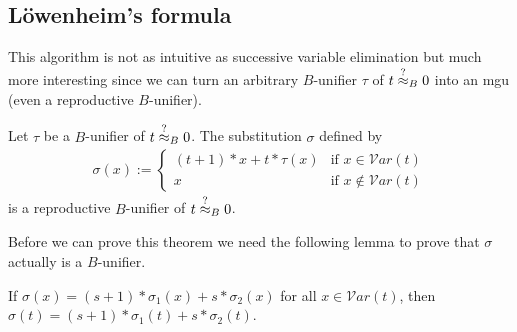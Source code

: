 	\subsection{Löwenheim's formula}
	This algorithm is not as intuitive as successive variable elimination but much more interesting since we can turn an arbitrary $B$-unifier $\tau$ of $t\stackrel{?}{\approx}_B0$ into an mgu (even a reproductive $B$-unifier).
	\begin{theorem}\label{lowenheim}
		Let $\tau$ be a $B$-unifier of $t\stackrel{?}{\approx}_B0$. The substitution $\sigma$ defined by
		\begin{align*}
			\sigma(x):=\begin{cases}
			(t+1)*x+t*\tau(x) & \text{if }x\in\mathcal{V}ar(t)    \\
			x                 & \text{if }x\notin\mathcal{V}ar(t) 
			\end{cases}
		\end{align*}
		is a reproductive $B$-unifier of $t\stackrel{?}{\approx}_B0$.
	\end{theorem}
	Before we can prove this theorem we need the following lemma to prove that $\sigma$ actually is a $B$-unifier. 
	\begin{lemma}\label{lowenLemma}
		If $\sigma(x)=(s+1)*\sigma_1(x)+s*\sigma_2(x)$ for all $x\in\mathcal{V}ar(t)$, then $\sigma(t)=(s+1)*\sigma_1(t)+s*\sigma_2(t)$.
	\end{lemma}

